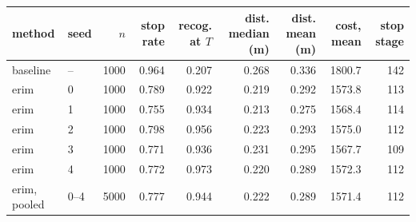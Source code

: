 \begin{tabular}{llrrrrrrr}
\toprule
method & seed & $n$ & stop rate & recog. at $T$ & dist. median (m) & dist. mean (m) & cost, mean & stop stage \\
\midrule
baseline & -- & 1000 & 0.964 & 0.207 & 0.268 & 0.336 & 1800.7 & 142 \\
erim & 0 & 1000 & 0.789 & 0.922 & 0.219 & 0.292 & 1573.8 & 113 \\
erim & 1 & 1000 & 0.755 & 0.934 & 0.213 & 0.275 & 1568.4 & 114 \\
erim & 2 & 1000 & 0.798 & 0.956 & 0.223 & 0.293 & 1575.0 & 112 \\
erim & 3 & 1000 & 0.771 & 0.936 & 0.231 & 0.295 & 1567.7 & 109 \\
erim & 4 & 1000 & 0.772 & 0.973 & 0.220 & 0.289 & 1572.3 & 112 \\
\midrule
erim, pooled & 0--4 & 5000 & 0.777 & 0.944 & 0.222 & 0.289 & 1571.4 & 112 \\
\bottomrule
\end{tabular}